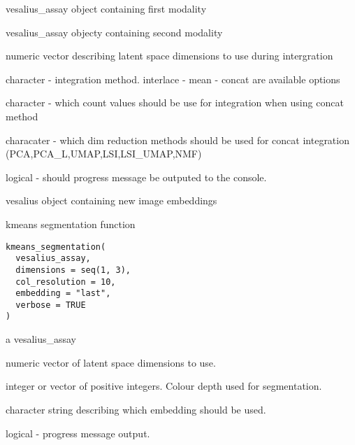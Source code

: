\documentclass[a4paper]{book}
\begin{document}
%
\begin{Arguments}
\begin{ldescription}
\item[\code{mod1}] vesalius\_assay object containing first modality

\item[\code{mod2}] vesalius\_assay objecty containing second modality

\item[\code{dimensions}] numeric vector describing latent space dimensions 
to use during intergration

\item[\code{method}] character - integration method. interlace - mean - concat 
are available options

\item[\code{norm\_method}] character - which count values should be use 
for integration when using concat method

\item[\code{dim\_reduction}] characater - which dim reduction methods should be 
used for concat integration (PCA,PCA\_L,UMAP,LSI,LSI\_UMAP,NMF)

\item[\code{verbose}] logical - should progress message be outputed to the 
console.
\end{ldescription}
\end{Arguments}
%
\begin{Value}
vesalius object containing new image embeddings
\end{Value}
%
\begin{Description}
kmeans segmentation function
\end{Description}
%
\begin{Usage}
\begin{verbatim}
kmeans_segmentation(
  vesalius_assay,
  dimensions = seq(1, 3),
  col_resolution = 10,
  embedding = "last",
  verbose = TRUE
)
\end{verbatim}
\end{Usage}
%
\begin{Arguments}
\begin{ldescription}
\item[\code{vesalius\_assay}] a vesalius\_assay

\item[\code{dimensions}] numeric vector of latent space dimensions to use.

\item[\code{col\_resolution}] integer or vector of positive integers.
Colour depth used for segmentation.

\item[\code{embedding}] character string describing which embedding should
be used.

\item[\code{verbose}] logical - progress message output.
\end{ldescription}
\end{Arguments}
\end{document}
